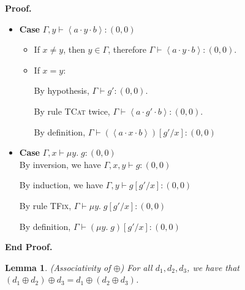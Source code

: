 \documentclass{article}
\newcommand{\fix}[2]{\mu {#1}.\;{#2}}
\newcommand{\lft}[1]{\left<{#1}\right.}
\newcommand{\rgt}[1]{\left.{#1}\right>}
\newcommand{\judgebalance}[3][\Gamma]{{#1} \vdash {#2} : {#3}}
\newcommand{\combine}[2]{{#1} \oplus {#2}}
\newcommand{\zero}{(0,0)}
\newtheorem{lemma}{Lemma}
\newenvironment{proof}{\noindent\textbf{Proof.}}{\noindent\textbf{End Proof.}}
\newenvironment{caseblock}{\begin{itemize}}{\end{itemize}}
\newenvironment{case}[1]{\item \textbf{Case} {#1}\\}{}
\begin{document}
\begin{proof}
\begin{caseblock}
\begin{case}{$\judgebalance[\Gamma, y]{\lft{a}\cdot y \cdot\rgt{b}}{\zero}$}
      \begin{itemize}
        \item If $x \not= y$, then $y \in \Gamma$, therefore
          $\judgebalance{\lft{a}\cdot y \cdot\rgt{b}}{\zero}$. 

        \item If $x = y$:
          
          By hypothesis, $\judgebalance{g'}{\zero}$.

          By rule \textsc{TCat} twice, $\judgebalance{\lft{a}\cdot g'\cdot\rgt{b}}{\zero}$. 

          By definition, $\judgebalance{(\lft{a}\cdot x \cdot\rgt{b})[g'/x]}{\zero}$
      \end{itemize}
    \end{case}

    \begin{case}{$\judgebalance[\Gamma, x]{\fix{y}{g}}{\zero}$}
      By inversion, we have $\judgebalance[\Gamma, x, y]{g}{\zero}$

      By induction, we have $\judgebalance[\Gamma, y]{g[g'/x]}{\zero}$

      By rule \textsc{TFix}, $\judgebalance{\fix{y}{g[g'/x]}}{\zero}$

      By definition, $\judgebalance{(\fix{y}{g})[g'/x]}{\zero}$
    \end{case}
  \end{caseblock}
\end{proof}

\begin{lemma}{(Associativity of $\oplus$)}
  For all $d_1, d_2, d_3$, we have that 
  $\combine{(\combine{d_1}{d_2})}{d_3} = \combine{d_1}{(\combine{d_2}{d_3})} $. 
\end{lemma}
\end{document}
